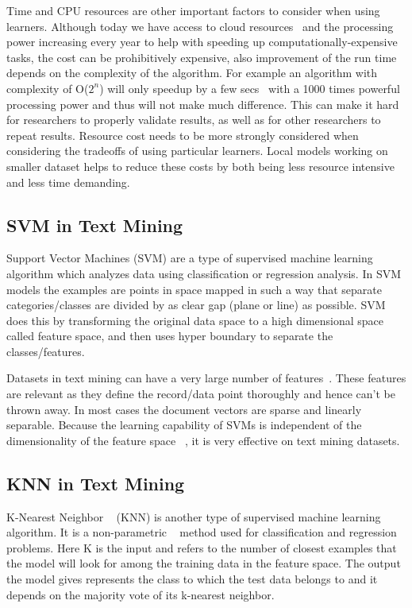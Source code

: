 \documentclass[sigconf]{acmart}
\theoremstyle{break}
\begin{document}
    Time and CPU resources are other important factors to consider when using learners. Although today we have access to cloud resources~\cite{buyya2008market} and the processing power increasing every year to help with speeding up computationally-expensive tasks, the cost can be prohibitively expensive, also improvement of the run time depends on the complexity of the algorithm. For example an algorithm with complexity of O($2^n$) will only speedup by a few secs~\cite{cormen2009introduction} with a 1000 times powerful processing power and thus will not make much difference. This can make it hard for researchers to properly validate results, as well as for other researchers to repeat results. Resource cost needs to be more strongly considered when considering the tradeoffs of using particular learners. Local models working on smaller dataset helps to reduce these costs by both being less resource intensive and less time demanding. 
    
    
    
    \subsection{SVM in Text Mining}
    \label{sssec:SVM in Text Mining}
    Support Vector Machines (SVM) are a type of supervised machine learning algorithm which analyzes data using classification or regression analysis. In SVM models the examples are points in space mapped in such a way that separate categories/classes are divided by as clear gap (plane or line) as possible. SVM ~\cite{suykens1999least} does this by transforming the original data space to a high dimensional space called feature space, and then uses hyper boundary to separate the classes/features.  
    
    Datasets in text mining can have a very large number of features~\cite{gamon2004sentiment}. These features are relevant as they define the record/data point thoroughly and hence can't be thrown away. In most cases the document vectors are sparse and linearly separable. Because the learning capability of SVMs is independent of the dimensionality of the feature space ~\cite{joachims1998text}, it is very effective on text mining datasets.
    
    \subsection{KNN in Text Mining}
    \label{sssec:KNN in Text Mining}
    K-Nearest Neighbor ~\cite{zhang2007ml} (KNN)  is another type of supervised machine learning algorithm. It is a non-parametric ~\cite{goldberger2005neighbourhood} method used for classification and regression problems. Here K is the input and refers to the number of closest examples that the model will look for among the training data in the feature space. The output the model gives represents the class to which the test data belongs to and it depends on the majority vote of its k-nearest neighbor.
  
\end{document}
